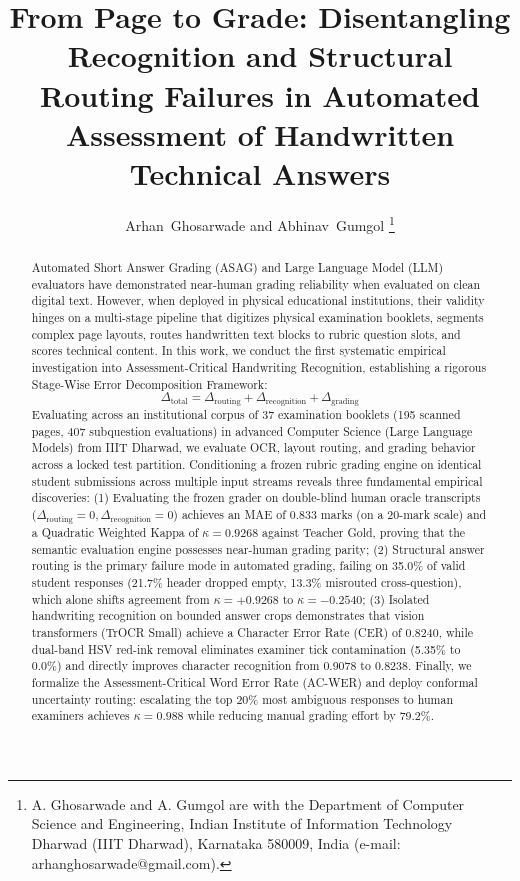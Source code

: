 \documentclass[journal]{IEEEtran}
\title{From Page to Grade: Disentangling Recognition and Structural Routing Failures in Automated Assessment of Handwritten Technical Answers}
\author{Arhan~Ghosarwade and Abhinav~Gumgol%
\thanks{A. Ghosarwade and A. Gumgol are with the Department of Computer Science and Engineering, Indian Institute of Information Technology Dharwad (IIIT Dharwad), Karnataka 580009, India (e-mail: arhanghosarwade@gmail.com).}}
\begin{document}
\maketitle

\begin{abstract}
Automated Short Answer Grading (ASAG) and Large Language Model (LLM) evaluators have demonstrated near-human grading reliability when evaluated on clean digital text. However, when deployed in physical educational institutions, their validity hinges on a multi-stage pipeline that digitizes physical examination booklets, segments complex page layouts, routes handwritten text blocks to rubric question slots, and scores technical content. In this work, we conduct the first systematic empirical investigation into Assessment-Critical Handwriting Recognition, establishing a rigorous Stage-Wise Error Decomposition Framework:
\begin{equation}
\Delta_{\text{total}} = \Delta_{\text{routing}} + \Delta_{\text{recognition}} + \Delta_{\text{grading}}
\end{equation}
Evaluating across an institutional corpus of 37 examination booklets (195 scanned pages, 407 subquestion evaluations) in advanced Computer Science (Large Language Models) from IIIT Dharwad, we evaluate OCR, layout routing, and grading behavior across a locked test partition. Conditioning a frozen rubric grading engine on identical student submissions across multiple input streams reveals three fundamental empirical discoveries:
(1) Evaluating the frozen grader on double-blind human oracle transcripts ($\Delta_{\text{routing}} = 0, \Delta_{\text{recognition}} = 0$) achieves an MAE of 0.833 marks (on a 20-mark scale) and a Quadratic Weighted Kappa of $\kappa = 0.9268$ against Teacher Gold, proving that the semantic evaluation engine possesses near-human grading parity;
(2) Structural answer routing is the primary failure mode in automated grading, failing on 35.0\% of valid student responses (21.7\% header dropped empty, 13.3\% misrouted cross-question), which alone shifts agreement from $\kappa = +0.9268$ to $\kappa = -0.2540$;
(3) Isolated handwriting recognition on bounded answer crops demonstrates that vision transformers (TrOCR Small) achieve a Character Error Rate (CER) of 0.8240, while dual-band HSV red-ink removal eliminates examiner tick contamination (5.35\% to 0.0\%) and directly improves character recognition from 0.9078 to 0.8238.
Finally, we formalize the Assessment-Critical Word Error Rate (AC-WER) and deploy conformal uncertainty routing: escalating the top 20\% most ambiguous responses to human examiners achieves $\kappa = 0.988$ while reducing manual grading effort by 79.2\%.
\end{abstract}
\end{document}
